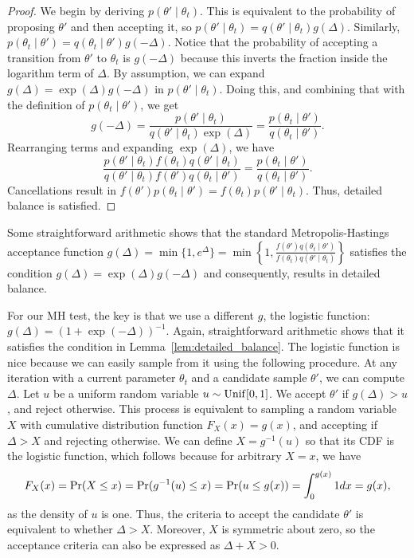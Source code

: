 \documentclass{article}
\begin{document}
\begin{proof}
We begin by deriving $p(\theta' \mid \theta_t)$. This is equivalent to the probability of proposing
$\theta'$ and then accepting it, so $p(\theta' \mid \theta_t) = q(\theta' \mid \theta_t)g(\Delta).$
Similarly, $p(\theta_t \mid \theta') = q(\theta_t \mid \theta')g(-\Delta).$ Notice that the
probability of accepting a transition from $\theta'$ to $\theta_t$ is $g(-\Delta)$ because this
inverts the fraction inside the logarithm term of $\Delta$.  By assumption, we can expand $g(\Delta)
= \exp(\Delta)g(-\Delta)$ in $p(\theta' \mid \theta_t)$. Doing this, and combining that with the
definition of $p(\theta_t \mid \theta')$, we get
\begin{equation}\label{eq:combined}
g(-\Delta) = \frac{p(\theta' \mid \theta_t)}{q(\theta' \mid \theta_t)\exp(\Delta)} = \frac{p(\theta_t \mid \theta')}{q(\theta_t \mid \theta')}.
\end{equation}
Rearranging terms and expanding $\exp(\Delta)$, we have
\begin{equation}\label{eq:rearrange}
\frac{p(\theta' \mid \theta_t) f(\theta_t) q(\theta' \mid \theta_t)}{q(\theta' \mid \theta_t) f(\theta') q(\theta_t \mid \theta')} = \frac{p(\theta_t \mid \theta')}{ q(\theta_t \mid \theta')}.
\end{equation}
Cancellations result in $f(\theta') p(\theta_t \mid \theta') = f(\theta_t) p(\theta' \mid
\theta_t)$. Thus, detailed balance is satisfied.
\end{proof}

Some straightforward arithmetic shows that the standard Metropolis-Hastings acceptance function
$g(\Delta) = \min\{1, e^\Delta \} = \min\left\{1, \frac{f(\theta')q(\theta_t \mid
\theta')}{f(\theta_t)q(\theta' \mid \theta_t)}\right\}$ satisfies the condition $g(\Delta) =
\exp(\Delta)g(-\Delta)$ and consequently, results in detailed balance.

For our MH test, the key is that we use a different $g$, the logistic function: $g(\Delta) =
(1+\exp(-\Delta))^{-1}$. Again, straightforward arithmetic shows that it satisfies the
condition in Lemma~\ref{lem:detailed_balance}.  The logistic function is nice because we can easily
sample from it using the following procedure. At any iteration with a current parameter $\theta_t$
and a candidate sample $\theta'$, we can compute $\Delta$. Let $u$ be a uniform random variable $u
\sim {\rm Unif}[0,1]$. We accept $\theta'$ if $g(\Delta) > u$, and reject otherwise. This process is
equivalent to sampling a random variable $X$ with cumulative distribution function $F_X(x) = g(x)$,
and accepting if $\Delta > X$ and rejecting otherwise. We can define $X = g^{-1}(u)$ so that its CDF
is the logistic function, which follows because for arbitrary $X = x$, we have
\[
F_X(x) = {\rm Pr}(X \le x) = {\rm Pr}(g^{-1}(u) \le x) = {\rm Pr}(u \le g(x)) = \int_{0}^{g(x)} 1 dx = g(x),
\]
as the density of $u$ is one. Thus, the criteria to accept the candidate $\theta'$ is equivalent to
whether $\Delta > X$. Moreover, $X$ is symmetric about zero, so the acceptance criteria can also be
expressed as $\Delta + X>0$.
\end{document}

